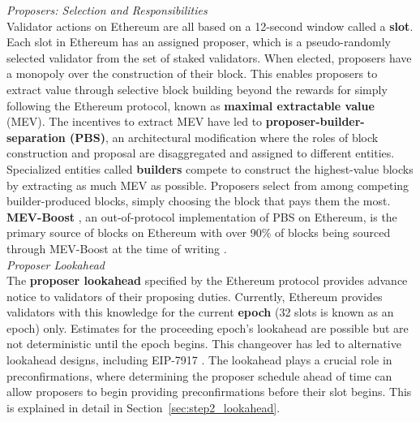 \documentclass[a4paper]{article}
\theoremstyle{boldstyle}
\begin{document}
    \textit{Proposers: Selection and Responsibilities} \\
        Validator actions on Ethereum are all based on a 12-second window called a \textbf{slot}. Each slot in Ethereum has an assigned proposer, which is a pseudo-randomly selected validator from the set of staked validators. When elected, proposers have a monopoly over the construction of their block. This enables proposers to extract value through selective block building beyond the rewards for simply following the Ethereum protocol, known as \textbf{maximal extractable value} (MEV).
        The incentives to extract MEV have led to \textbf{proposer-builder-separation (PBS)}, an architectural modification where the roles of block construction and proposal are disaggregated and assigned to different entities. Specialized entities called \textbf{builders} compete to construct the highest-value blocks by extracting as much MEV as possible. 
        Proposers select from among competing builder-produced blocks, simply choosing the block that pays them the most. \textbf{MEV-Boost} \cite{MEV-Boost}, an out-of-protocol implementation of PBS on Ethereum, is the primary source of blocks on Ethereum with over 90\% of blocks being sourced through MEV-Boost at the time of writing \cite{MEV.pics}. \\

    \textit{Proposer Lookahead} \\
        The \textbf{proposer lookahead} specified by the Ethereum protocol provides advance notice to validators of their proposing duties. Currently, Ethereum provides validators with this knowledge for the current \textbf{epoch} (32 slots is known as an epoch) only. Estimates for the proceeding epoch's lookahead are possible but are not deterministic until the epoch begins. This changeover has led to alternative lookahead designs, including EIP-7917 \cite{EIP7917}. The lookahead plays a crucial role in preconfirmations, where determining the proposer schedule ahead of time can allow proposers to begin providing preconfirmations before their slot begins. This is explained in detail in Section~\ref{sec:step2_lookahead}. \\
    
\end{document}
